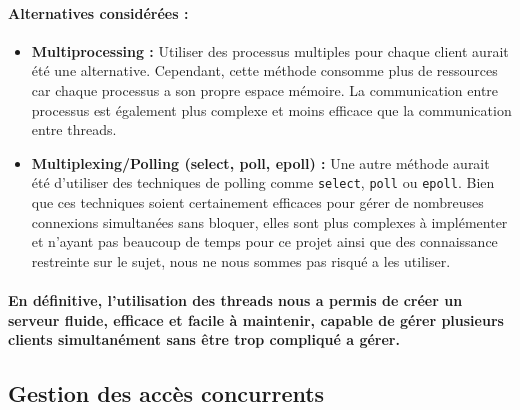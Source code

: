 \documentclass[utf8]{article}
\begin{document}
\paragraph{Alternatives considérées :}
\begin{itemize}
    \item \textbf{Multiprocessing :} Utiliser des processus multiples pour chaque client aurait été une alternative. Cependant, cette méthode consomme plus de ressources car chaque processus a son propre espace mémoire. La communication entre processus est également plus complexe et moins efficace que la communication entre threads.
    \item \textbf{Multiplexing/Polling (select, poll, epoll) :} Une autre méthode aurait été d'utiliser des techniques de polling comme \texttt{select}, \texttt{poll} ou \texttt{epoll}. Bien que ces techniques soient certainement efficaces pour gérer de nombreuses connexions simultanées sans bloquer, elles sont plus complexes à implémenter et n'ayant pas beaucoup de temps pour ce projet ainsi que des connaissance restreinte sur le sujet, nous ne nous sommes pas risqué a les utiliser.
\end{itemize}

\paragraph{En définitive, l'utilisation des threads nous a permis de créer un serveur fluide, 
efficace et facile à maintenir, capable de gérer plusieurs clients simultanément sans être trop 
compliqué a gérer.}

\subsection{Gestion des accès concurrents}
\end{document}
